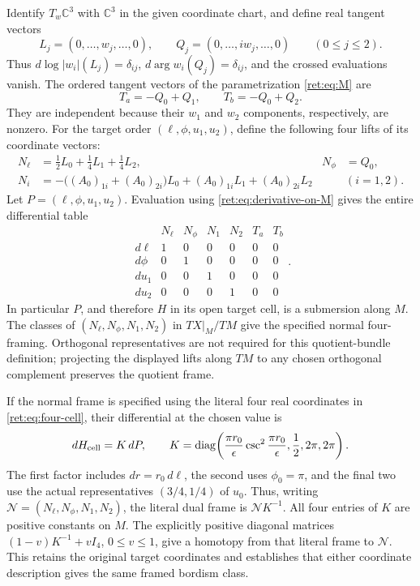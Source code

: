 \documentclass[11pt]{article}
\theoremstyle{definition}
\begin{document}
Identify \(T_w\mathbb C^3\) with \(\mathbb C^3\) in the given coordinate chart,
and define real tangent vectors
\begin{equation}
 L_j=(0,\ldots,w_j,\ldots,0),\qquad
 Q_j=(0,\ldots,iw_j,\ldots,0)\qquad(0\leq j\leq2).
 \label{ret:eq:LQ}
\end{equation}
Thus \(d\log|w_i|(L_j)=\delta_{ij}\),
\(d\arg w_i(Q_j)=\delta_{ij}\), and the crossed evaluations vanish.
The ordered tangent vectors of the parametrization \eqref{ret:eq:M} are
\begin{equation}
 T_a=-Q_0+Q_1,\qquad T_b=-Q_0+Q_2.
 \label{ret:eq:tangents}
\end{equation}
They are independent because their \(w_1\) and \(w_2\) components,
respectively, are nonzero.  For the target order
\((\ell,\phi,u_1,u_2)\), define the following four lifts of its
coordinate vectors:
\begin{align}
 N_\ell&=\tfrac12L_0+\tfrac14L_1+\tfrac14L_2,
       &N_\phi&=Q_0,\label{ret:eq:normal-first}\\
 N_i&=-\bigl((A_0)_{1i}+(A_0)_{2i}\bigr)L_0
           +(A_0)_{1i}L_1+(A_0)_{2i}L_2
       &&(i=1,2).\label{ret:eq:normal-u}
\end{align}
Let \(P=(\ell,\phi,u_1,u_2)\).  Evaluation using
\eqref{ret:eq:derivative-on-M} gives the entire differential table
\begin{equation}
\begin{array}{c|rrrrrr}
 &N_\ell&N_\phi&N_1&N_2&T_a&T_b\\\hline
 d\ell&1&0&0&0&0&0\\
 d\phi&0&1&0&0&0&0\\
 du_1&0&0&1&0&0&0\\
 du_2&0&0&0&1&0&0
\end{array}.
 \label{ret:eq:differential-table}
\end{equation}
In particular \(P\), and therefore \(H\) in its open target cell,
is a submersion along \(M\).  The classes of
\((N_\ell,N_\phi,N_1,N_2)\) in \(TX|_M/TM\) give the specified
normal four-framing.  Orthogonal representatives are not required for
this quotient-bundle definition; projecting the displayed lifts along
\(TM\) to any chosen orthogonal complement preserves the quotient
frame.

If the normal frame is specified using the literal four real coordinates
in \eqref{ret:eq:four-cell}, their differential at the chosen value is
\[
 dH_{\rm cell}=K\,dP,\qquad
 K=\operatorname{diag}\!\left(
 \frac{\pi r_0}{\epsilon}\csc^2\frac{\pi r_0}{\epsilon},
 \frac12,2\pi,2\pi\right).
\]
The first factor includes \(dr=r_0\,d\ell\), the second uses
\(\phi_0=\pi\), and the final two use the actual representatives
\((3/4,1/4)\) of \(u_0\). Thus, writing
\(\mathcal N=(N_\ell,N_\phi,N_1,N_2)\), the literal dual frame is
\(\mathcal N K^{-1}\). All four entries of \(K\) are positive
constants on \(M\). The explicitly positive diagonal matrices
\((1-v)K^{-1}+vI_4\), \(0\leq v\leq1\), give a homotopy
from that literal frame to \(\mathcal N\). This retains the original
target coordinates and establishes that either coordinate description
gives the same framed bordism class.
\end{document}
